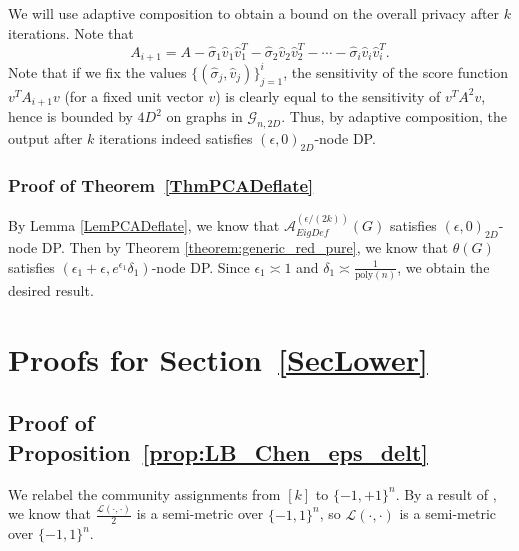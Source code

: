 \documentclass{article}
\newcommand{\thetahat}{\ensuremath{\widehat{\theta}}}
\begin{document}
We will use adaptive composition to obtain a bound on the overall privacy after $k$ iterations. Note that
\begin{equation*}
A_{i+1} = A - \hat{\sigma}_1 \hat{v}_1 \hat{v}_1^T - \hat{\sigma}_2 \hat{v}_2 \hat{v}_2^T - \cdots - \hat{\sigma}_i \hat{v}_i \hat{v}_i^T.
\end{equation*}
Note that if we fix the values $\{(\hat{\sigma}_j, \hat{v}_j)\}_{j=1}^i$, the sensitivity of the score function $v^T A_{i+1} v$ (for a fixed unit vector $v$) is clearly equal to the sensitivity of $v^T A^2 v$, hence is bounded by $4D^2$ on graphs in $\mathcal{G}_{n, 2D}$. Thus, by adaptive composition, the output after $k$ iterations indeed satisfies $(\epsilon, 0)_{2D}$-node DP.

\subsubsection{Proof of Theorem~\ref{ThmPCADeflate}}
\label{AppThmPCADeflate}

By Lemma \ref{LemPCADeflate}, we know that $\mathcal{A}_{EigDef}^{(\epsilon/(2k))}(G)$ satisfies $(\epsilon, 0)_{2D}$-node DP. Then by Theorem \ref{theorem:generic_red_pure}, we know that $\thetahat(G)$ satisfies $(\epsilon_1 + \epsilon, e^{\epsilon_1}\delta_1)$-node DP. Since $\epsilon_1 \asymp 1$ and $\delta_1 \asymp \frac{1}{\mathrm{poly}(n)}$, we obtain the desired result.


\section{Proofs for Section~\ref{SecLower}}
\label{AppLower}

\subsection{Proof of Proposition~\ref{prop:LB_Chen_eps_delt}}
\label{AppPropLBApprox}

We relabel the community assignments from $[k]$ to $\{-1, +1\}^n$. By a result of \cite{CheEtal23}, we know that
$\frac{\mathcal{L}(\cdot, \cdot)}{2}$ is a semi-metric over $\{-1, 1\}^n$, so $\mathcal{L}(\cdot, \cdot)$ is a semi-metric over $\{-1, 1\}^n$.
\end{document}
